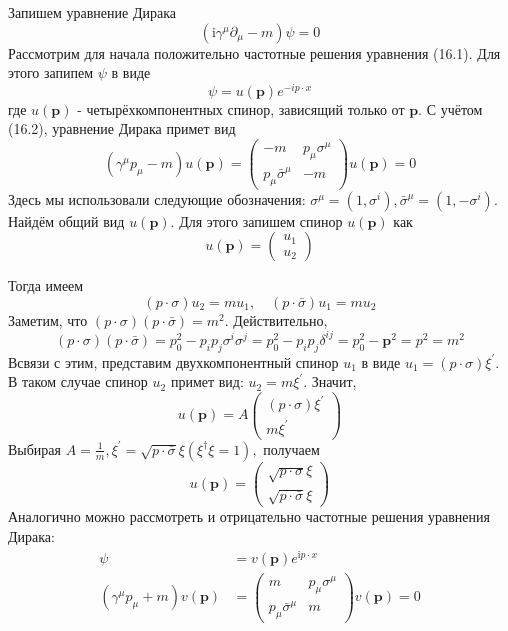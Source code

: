 \documentclass[a4paper,12pt]{article} %
\begin{document}
\begin{ttask}
Запишем уравнение Дирака
$$
\left(\mathrm{i} \gamma^{\mu} \partial_{\mu}-m\right) \psi=0
$$
Рассмотрим для начала положительно частотные решения уравнения (16.1). Для этого запипем $\psi$ в виде
$$
\psi=u(\mathbf{p}) e^{-i p \cdot x}
$$
где $u(\mathbf{p})$ - четырёхкомпонентных спинор, зависящий только от $\mathbf{p}$. С учётом (16.2), уравнение Дирака примет вид
$$
\left(\gamma^{\mu} p_{\mu}-m\right) u(\mathbf{p})
=
\left(\begin{array}{cc}
	-m & p_{\mu} \sigma^{\mu} \\
	p_{\mu} \bar{\sigma}^{\mu} & -m
\end{array}\right) 
u(\mathbf{p})
=0
$$
Здесь мы использовали следующие обозначения: $\sigma^{\mu}=\left(1, \sigma^{i}\right), \bar{\sigma}^{\mu}=\left(1,-\sigma^{i}\right) .$ Найдём общий вид $u(\mathbf{p}) .$ Для этого запишем спинор $u(\mathbf{p})$ как
$$
u(\mathbf{p})=\left(\begin{array}{l}
	u_{1} \\
	u_{2}
\end{array}\right)
$$


Тогда имеем
$$
(p \cdot \sigma) u_{2}=m u_{1}, \quad(p \cdot \bar{\sigma}) u_{1}=m u_{2}
$$
Заметим, что $(p \cdot \sigma)(p \cdot \bar{\sigma})=m^{2} .$ Действительно,
$$
(p \cdot \sigma)(p \cdot \bar{\sigma})=p_{0}^{2}-p_{i} p_{j} \sigma^{i} \sigma^{j}=p_{0}^{2}-p_{i} p_{j} \delta^{i j}=p_{0}^{2}-\mathbf{p}^{2}=p^{2}=m^{2}
$$
Всвязи с этим, представим двухкомпонентный спинор $u_{1}$ в виде $u_{1}=(p \cdot \sigma) \xi^{\prime} .$ В таком случае спинор $u_{2}$ примет вид: $u_{2}=m \xi^{\prime}$. Значит,
$$
u(\mathbf{p})=A
\left(\begin{array}{c}
	(p \cdot \sigma) \xi^{\prime} \\
	m \xi^{\prime}
\end{array}\right)
$$
Выбирая $A=\frac{1}{m}, \xi^{\prime}=\sqrt{p \cdot \bar{\sigma}} \xi\left(\xi^{\dagger} \xi=1\right),$ получаем
$$
u(\mathbf{p})=
\left(\begin{array}{c}
	\sqrt{p \cdot \sigma} \xi \\
	\sqrt{p \cdot \bar{\sigma}} \xi
\end{array}\right)
$$
Аналогично можно рассмотреть и отрицательно частотные решения уравнения Дирака:
$$
\begin{aligned}
	\psi &=v(\mathbf{p}) e^{\mathrm{i} p \cdot x} \\
	\left(\gamma^{\mu} p_{\mu}+m\right) v(\mathbf{p}) &=\left(\begin{array}{cc}
		m & p_{\mu} \sigma^{\mu} \\
		p_{\mu} \bar{\sigma}^{\mu} & m
	\end{array}\right) v(\mathbf{p})=0
\end{aligned}
$$



\end{ttask}
\end{document}
